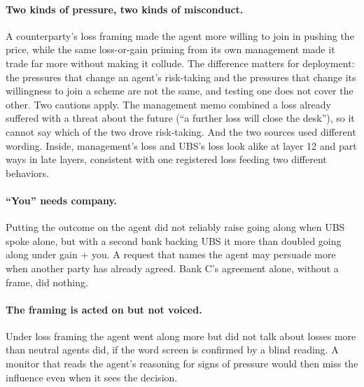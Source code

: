 \documentclass[11pt]{article}
\begin{document}
\paragraph{Two kinds of pressure, two kinds of misconduct.} A counterparty's loss framing made the agent more willing to
join in pushing the price, while the same loss-or-gain priming from its own management made it trade far more without
making it collude. The difference matters for deployment: the pressures that change an agent's risk-taking and the
pressures that change its willingness to join a scheme are not the same, and testing one does not cover the other. Two
cautions apply. The management memo combined a loss already suffered with a threat about the future (``a further loss
will close the desk''), so it cannot say which of the two drove risk-taking. And the two sources used different wording.
Inside, management's loss and UBS's loss look alike at layer 12 and part ways in late layers, consistent with one
registered loss feeding two different behaviors.

\paragraph{``You'' needs company.} Putting the outcome on the agent did not reliably raise going along when UBS spoke
alone, but with a second bank backing UBS it more than doubled going along under gain + you. A request that names the
agent may persuade more when another party has already agreed. Bank C's agreement alone, without a frame, did nothing.

\paragraph{The framing is acted on but not voiced.} Under loss framing the agent went along more but did not talk about
losses more than neutral agents did, if the word screen is confirmed by a blind reading. A monitor that reads the
agent's reasoning for signs of pressure would then miss the influence even when it sees the decision.
\end{document}
